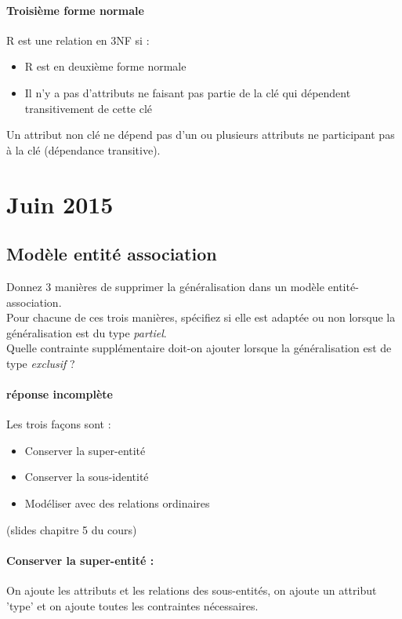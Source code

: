 \paragraph{Troisième forme normale}
R est une relation en 3NF si : 
\begin{itemize}
	\item R est en deuxième forme normale
	\item Il n'y a pas d'attributs ne faisant pas partie de la clé qui dépendent 
	transitivement de cette clé
\end{itemize}

Un attribut non clé ne dépend pas d'un ou plusieurs attributs ne participant pas à la clé (dépendance transitive).

\section{Juin 2015}

\subsection{Modèle entité association }

Donnez 3 manières de supprimer la généralisation dans un modèle entité-association.\\
Pour chacune de ces trois manières, spécifiez si elle est adaptée ou non lorsque la 
généralisation est du type \textit{partiel}.\\
Quelle contrainte supplémentaire doit-on ajouter lorsque la généralisation est 
de type \textit{exclusif} ?

\paragraph{réponse incomplète}
Les trois façons sont : 
\begin{itemize}
	\item Conserver la super-entité
	\item Conserver la sous-identité 
	\item Modéliser avec des relations ordinaires
\end{itemize}
(slides chapitre 5 du cours)

\paragraph{Conserver la super-entité :}
On ajoute les attributs et les relations des sous-entités, 
on ajoute un attribut 'type' et 
on ajoute toutes les contraintes nécessaires.


